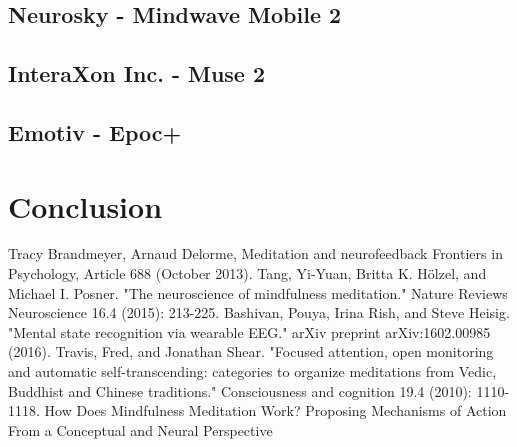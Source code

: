 \documentclass{llncs} %
\begin{document}
\subsection{Neurosky - Mindwave Mobile 2}
\subsection{InteraXon Inc. - Muse 2}
\subsection{Emotiv - Epoc+}
\section{Conclusion}


\begin{thebibliography}{[MT1]}
    Tracy Brandmeyer, Arnaud Delorme,
    Meditation and neurofeedback
    Frontiers in Psychology, Article 688 (October 2013).
    Tang, Yi-Yuan, Britta K. Hölzel, and Michael I. Posner. "The neuroscience of mindfulness meditation." Nature Reviews Neuroscience 16.4 (2015): 213-225.
    Bashivan, Pouya, Irina Rish, and Steve Heisig. "Mental state recognition via wearable EEG." arXiv preprint arXiv:1602.00985 (2016).    
    Travis, Fred, and Jonathan Shear. "Focused attention, open monitoring and automatic self-transcending: categories to organize meditations from Vedic, Buddhist and Chinese traditions." Consciousness and cognition 19.4 (2010): 1110-1118.
    How Does Mindfulness Meditation Work? Proposing Mechanisms of Action From a Conceptual and Neural Perspective
\end{thebibliography}
\end{document}
